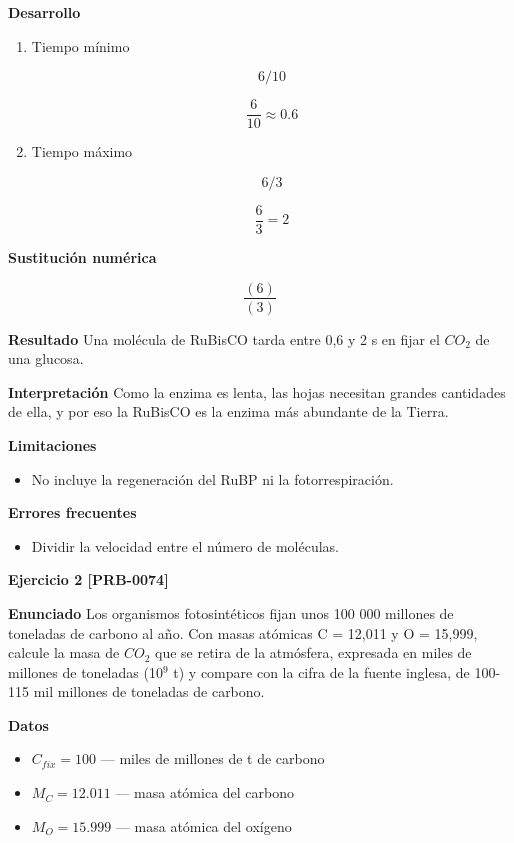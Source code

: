 \documentclass{book}
\begin{document}
\noindent\textbf{Desarrollo}
\begin{enumerate}
\item
Tiempo mínimo


\[
6/10
\]

\[
\frac{6}{10} \approx 0.6
\]
\item
Tiempo máximo


\[
6/3
\]

\[
\frac{6}{3} = 2
\]
\end{enumerate}

\noindent\textbf{Sustitución numérica}

\[
\frac{\left(6\right)}{\left(3\right)}
\]

\noindent\textbf{Resultado}
Una molécula de RuBisCO tarda entre 0,6 y 2 s en fijar el \(CO_{2}\) de una glucosa.


\noindent\textbf{Interpretación}
Como la enzima es lenta, las hojas necesitan grandes cantidades de ella, y por eso la RuBisCO es la enzima más abundante de la Tierra.


\noindent\textbf{Limitaciones}
\begin{itemize}
\item No incluye la regeneración del RuBP ni la fotorrespiración.
\end{itemize}

\noindent\textbf{Errores frecuentes}
\begin{itemize}
\item Dividir la velocidad entre el número de moléculas.
\end{itemize}

\noindent\textbf{Ejercicio 2 [PRB-0074]}

\noindent\textbf{Enunciado}
Los organismos fotosintéticos fijan unos 100 000 millones de toneladas de carbono al año. Con masas atómicas C = 12,011 y O = 15,999, calcule la masa de \(CO_{2}\) que se retira de la atmósfera, expresada en miles de millones de toneladas (10\({}^{9}\) t) y compare con la cifra de la fuente inglesa, de 100-115 mil millones de toneladas de carbono.


\noindent\textbf{Datos}
\begin{itemize}
\item $C_{fix} = 100$ — miles de millones de t de carbono
\item $M_{C} = 12.011$ — masa atómica del carbono
\item $M_{O} = 15.999$ — masa atómica del oxígeno
\end{itemize}
\end{document}
